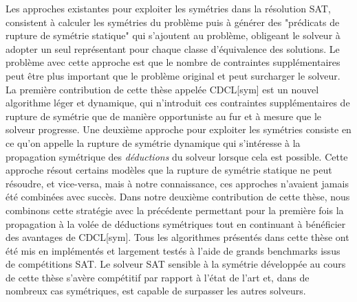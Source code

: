 Les approches existantes pour exploiter les symétries dans la résolution SAT, consistent à calculer les symétries du problème puis à générer des "prédicats de rupture de symétrie statique" qui s'ajoutent au problème, obligeant le solveur à adopter un seul représentant pour chaque classe d'équivalence des solutions.
Le problème avec cette approche est que le nombre de contraintes supplémentaires peut être plus important que le problème original et peut surcharger le solveur. La première contribution de cette thèse appelée CDCL[sym] est un nouvel algorithme léger et dynamique, qui n'introduit ces contraintes supplémentaires de rupture de symétrie que de manière opportuniste au fur et à mesure que le solveur progresse.
Une deuxième approche pour exploiter les symétries consiste en ce qu'on appelle la rupture de symétrie dynamique qui s'intéresse à la propagation symétrique des \textit{déductions} du solveur lorsque cela est possible.
Cette approche résout certains modèles que la rupture de symétrie statique ne peut résoudre, et vice-versa, mais à notre connaissance, ces approches n'avaient jamais été combinées avec succès. 
Dans notre deuxième contribution de cette thèse, nous combinons cette stratégie avec la précédente permettant pour la première fois la propagation à la volée de déductions symétriques tout en continuant à bénéficier des avantages de CDCL[sym].
Tous les algorithmes présentés dans cette thèse ont été mis en implémentés et largement testés à l'aide de grands benchmarks issus de compétitions SAT. Le solveur SAT sensible à la symétrie développée au cours de cette thèse s'avère compétitif par rapport à l'état de l'art et, dans de nombreux cas symétriques, est capable de surpasser les autres solveurs.
%
